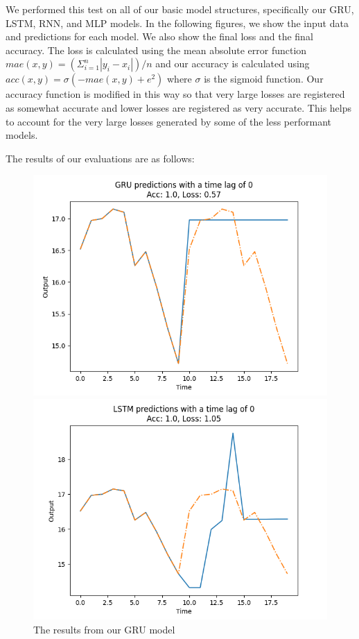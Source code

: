 \documentclass{ledger}
\begin{document}
We performed this test on all of our basic model structures, specifically our GRU, LSTM, RNN, and MLP models.
In the following figures, we show the input data and predictions for each model.  We also show the final loss
and the final accuracy.  The loss is calculated using the mean absolute error function
$mae(x, y) = (\Sigma^n_{i=1} |y_i - x_i|) / n$ and our accuracy is calculated using
$acc(x, y) = \sigma(-mae(x, y)+e^2)$ where $\sigma$ is the sigmoid function.  Our accuracy function is modified
in this way so that very large losses are registered as somewhat accurate and lower losses are registered as
very accurate.  This helps to account for the very large losses generated by some of the less performant models.

The results of our evaluations are as follows:

\begin{figure}[H]
    \begin{minipage}{0.49\textwidth}
        \centering
        \includegraphics[width=\linewidth]{images/gruEval}
        \caption{The results from our GRU model}\label{Fig:gruEval}
    \end{minipage}\hfill
    \begin{minipage}{0.49\textwidth}
        \centering
        \includegraphics[width=\linewidth]{images/lstmEval}

\end{minipage}
\end{figure}
\end{document}
